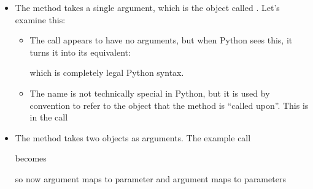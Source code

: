 \documentclass[letterpaper,10pt,english]{sphinxmanual}
\begin{document}
\begin{itemize}
\item {} 
The method  takes a single argument, which is the
 object called .  Let’s examine this:
\begin{itemize}
\item {} 
The call  appears to have no arguments, but
when Python sees this, it turns it into its equivalent:

%
\begin{sphinxVerbatim}[commandchars=\\\{\}]
\end{sphinxVerbatim}

which is completely legal Python syntax.

\item {} 
The name  is not technically special in Python, but it
is used by convention to refer to the object that the method is
“called upon”.  This is   in the call 

\end{itemize}

\item {} 
The method  takes two  objects as
arguments.  The example call

%
\begin{sphinxVerbatim}[commandchars=\\\{\}]
\end{sphinxVerbatim}

becomes

%
\begin{sphinxVerbatim}[commandchars=\\\{\}]
\end{sphinxVerbatim}

so now argument  maps to parameter  and argument 
maps to parameters 

\end{itemize}
\end{document}
